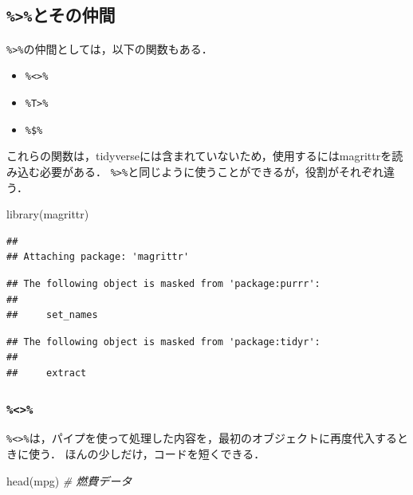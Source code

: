 \documentclass[
]{article}
\newenvironment{Shaded}{\begin{snugshade}}{\end{snugshade}}
\newcommand{\CommentTok}[1]{\textcolor[rgb]{0.56,0.35,0.01}{\textit{#1}}}
\newcommand{\FunctionTok}[1]{\textcolor[rgb]{0.00,0.00,0.00}{#1}}
\newcommand{\NormalTok}[1]{#1}
\providecommand{\tightlist}{%
  \setlength{\itemsep}{0pt}\setlength{\parskip}{0pt}}
\begin{document}
\hypertarget{ux3068ux305dux306eux4ef2ux9593}{%
\subsection{\texorpdfstring{\texttt{\%\textgreater{}\%}とその仲間}{\%\textgreater\%とその仲間}}\label{ux3068ux305dux306eux4ef2ux9593}}

\texttt{\%\textgreater{}\%}の仲間としては，以下の関数もある．

\begin{itemize}
\tightlist
\item
  \texttt{\%\textless{}\textgreater{}\%}
\item
  \texttt{\%T\textgreater{}\%}
\item
  \texttt{\%\$\%}
\end{itemize}

これらの関数は，tidyverseには含まれていないため，使用するにはmagrittrを読み込む必要がある．
\texttt{\%\textgreater{}\%}と同じように使うことができるが，役割がそれぞれ違う．

\begin{Shaded}
\begin{Highlighting}[]
\FunctionTok{library}\NormalTok{(magrittr)}
\end{Highlighting}
\end{Shaded}

\begin{verbatim}
## 
## Attaching package: 'magrittr'
\end{verbatim}

\begin{verbatim}
## The following object is masked from 'package:purrr':
## 
##     set_names
\end{verbatim}

\begin{verbatim}
## The following object is masked from 'package:tidyr':
## 
##     extract
\end{verbatim}

\hypertarget{section}{%
\subsubsection{\texorpdfstring{\texttt{\%\textless{}\textgreater{}\%}}{\%\textless\textgreater\%}}\label{section}}

\texttt{\%\textless{}\textgreater{}\%}は，パイプを使って処理した内容を，最初のオブジェクトに再度代入するときに使う．
ほんの少しだけ，コードを短くできる．

\begin{Shaded}
\begin{Highlighting}[]
\FunctionTok{head}\NormalTok{(mpg) }\CommentTok{\# 燃費データ}
\end{Highlighting}
\end{Shaded}
\end{document}
